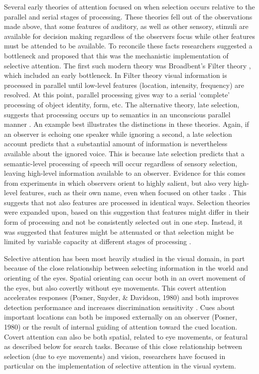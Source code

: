 \documentclass{report}
\begin{document}
Several early theories of attention focused on when selection occurs relative to the parallel and serial stages of processing. These theories fell out of the observations made above, that some features of auditory, as well as other sensory, stimuli are available for decision making regardless of the observers focus while other features must be attended to be available. To reconcile these facts researchers suggested a bottleneck and proposed that this was the mechanistic implementation of selective attention. The first such modern theory was Broadbent’s Filter theory \cite{Broadbent1958-ny}, which included an early bottleneck. In Filter theory visual information is processed in parallel until low-level features (location, intensity, frequency) are resolved. At this point, parallel processing gives way to a serial ‘complete’ processing of object identity, form, etc. The alternative theory, late selection, suggests that processing occurs up to semantics in an unconscious parallel manner \cite{Deutsch1963-ac}. An example best illustrates the distinctions in these theories. Again, if an observer is echoing one speaker while ignoring a second, a late selection account predicts that a substantial amount of information is nevertheless available about the ignored voice. This is because late selection predicts that a semantic-level processing of speech will occur regardless of sensory selection, leaving high-level information available to an observer. Evidence for this comes from experiments in which observers orient to highly salient, but also very high-level features, such as their own name, even when focused on other tasks \cite{Moray1959-fn}. This suggests that not also features are processed in identical ways. Selection theories were expanded upon, based on this suggestion that features might differ in their form of processing and not be consistently selected out in one step. Instead, it was suggested that features might be attenuated \cite{Treisman1960-qs} or that selection might be limited by variable capacity at different stages of processing \cite{Kahneman1973-af}.

Selective attention has been most heavily studied in the visual domain, in part because of the close relationship between selecting information in the world and orienting of the eyes. Spatial orienting can occur both in an overt movement of the eyes, but also covertly without eye movements. This covert attention accelerates responses \cite{Eriksen1972-qj} (Posner, Snyder, & Davidson, 1980) and both improves detection performance and increases discrimination sensitivity \cite{Carrasco2011-xp}. Cues about important locations can both be imposed externally on an observer (Posner, 1980) or the result of internal guiding of attention toward the cued location. Covert attention can also be both spatial, related to eye movements, or featural \cite{Rossi1995-wa} as described below for search tasks. Because of this close relationship between selection (due to eye movements) and vision, researchers have focused in particular on the implementation of selective attention in the visual system. 
\end{document}
